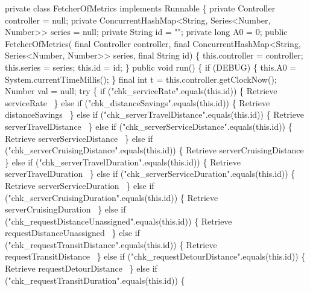\nwenddocs{}\plusendmoddef
private class FetcherOfMetrics implements Runnable \{
  private Controller controller = null;
  private ConcurrentHashMap<String, Series<Number, Number>> series = null;
  private String id = "";
  private long A0 = 0;
  public FetcherOfMetrics(
      final Controller controller,
      final ConcurrentHashMap<String, Series<Number, Number>> series,
      final String id) \{
    this.controller = controller;
    this.series = series;
    this.id = id;
  \}
  public void run() \{
    if (DEBUG) \{
      this.A0 = System.currentTimeMillis();
    \}
    final int t = this.controller.getClockNow();
    Number val = null;
    try \{
      if ("chk_serviceRate".equals(this.id)) \{
        \LA{}Retrieve serviceRate~{\nwtagstyle{}}\RA{}
      \} else if ("chk_distanceSavings".equals(this.id)) \{
        \LA{}Retrieve distanceSavings~{\nwtagstyle{}}\RA{}
      \} else if ("chk_serverTravelDistance".equals(this.id)) \{
        \LA{}Retrieve serverTravelDistance~{\nwtagstyle{}}\RA{}
      \} else if ("chk_serverServiceDistance".equals(this.id)) \{
        \LA{}Retrieve serverServiceDistance~{\nwtagstyle{}}\RA{}
      \} else if ("chk_serverCruisingDistance".equals(this.id)) \{
        \LA{}Retrieve serverCruisingDistance~{\nwtagstyle{}}\RA{}
      \} else if ("chk_serverTravelDuration".equals(this.id)) \{
        \LA{}Retrieve serverTravelDuration~{\nwtagstyle{}}\RA{}
      \} else if ("chk_serverServiceDuration".equals(this.id)) \{
        \LA{}Retrieve serverServiceDuration~{\nwtagstyle{}}\RA{}
      \} else if ("chk_serverCruisingDuration".equals(this.id)) \{
        \LA{}Retrieve serverCruisingDuration~{\nwtagstyle{}}\RA{}
      \} else if ("chk_requestDistanceUnassigned".equals(this.id)) \{
        \LA{}Retrieve requestDistanceUnassigned~{\nwtagstyle{}}\RA{}
      \} else if ("chk_requestTransitDistance".equals(this.id)) \{
        \LA{}Retrieve requestTransitDistance~{\nwtagstyle{}}\RA{}
      \} else if ("chk_requestDetourDistance".equals(this.id)) \{
        \LA{}Retrieve requestDetourDistance~{\nwtagstyle{}}\RA{}
      \} else if ("chk_requestTransitDuration".equals(this.id)) \{
